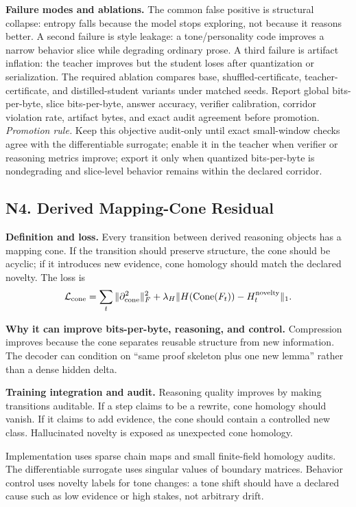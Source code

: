 \documentclass[10pt]{article}
\newcommand{\loss}{\mathcal{L}}
\numberwithin{equation}{section}
\begin{document}
\noindent\textbf{Failure modes and ablations.} The common false positive is structural collapse: entropy falls because the model stops exploring, not because it reasons better. A second failure is style leakage: a tone/personality code improves a narrow behavior slice while degrading ordinary prose. A third failure is artifact inflation: the teacher improves but the student loses after quantization or serialization. The required ablation compares base, shuffled-certificate, teacher-certificate, and distilled-student variants under matched seeds. Report global bits-per-byte, slice bits-per-byte, answer accuracy, verifier calibration, corridor violation rate, artifact bytes, and exact audit agreement before promotion.
\vfill
\noindent\emph{Promotion rule.} Keep this objective audit-only until exact small-window checks agree with the differentiable surrogate; enable it in the teacher when verifier or reasoning metrics improve; export it only when quantized bits-per-byte is nondegrading and slice-level behavior remains within the declared corridor.
\clearpage
\subsection{N4. Derived Mapping-Cone Residual}
\noindent\textbf{Definition and loss.} Every transition between derived reasoning objects has a mapping cone. If the transition should preserve structure, the cone should be acyclic; if it introduces new evidence, cone homology should match the declared novelty. The loss is
\[
\loss_{\rm cone}=\sum_t \|\partial_{\rm cone}^2\|_F^2+\lambda_H\|H(\mathrm{Cone}(F_t))-H_t^{\rm novelty}\|_1.
\]

\noindent\textbf{Why it can improve bits-per-byte, reasoning, and control.} Compression improves because the cone separates reusable structure from new information. The decoder can condition on ``same proof skeleton plus one new lemma'' rather than a dense hidden delta.

\noindent\textbf{Training integration and audit.} Reasoning quality improves by making transitions auditable. If a step claims to be a rewrite, cone homology should vanish. If it claims to add evidence, the cone should contain a controlled new class. Hallucinated novelty is exposed as unexpected cone homology.

Implementation uses sparse chain maps and small finite-field homology audits. The differentiable surrogate uses singular values of boundary matrices. Behavior control uses novelty labels for tone changes: a tone shift should have a declared cause such as low evidence or high stakes, not arbitrary drift.
\end{document}
